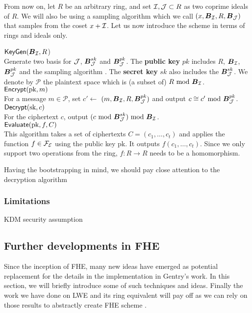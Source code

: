 From now on, let $R$ be an arbitrary ring, and set $\mathcal{I}, \mathcal{J} \subset R$ as two coprime ideals of $R$.  We will also be using a sampling algorithm which we call $(x, \boldsymbol{B}_{\mathcal{I}} , R, \boldsymbol{B}_{\mathcal{J}})$ that samples from the coset $x + \mathcal{I}$. Let us now introduce the scheme in terms of rings and ideals only.

\begin{mdframed}
	$\textsf{KeyGen}(\boldsymbol{B}_{\mathcal{I}}, R$) \\
	Generate two basis for $\mathcal{J}$, $\boldsymbol{B}_{\mathcal{J}}^{sk}$ and $\boldsymbol{B}_{\mathcal{J}}^{pk}$. The \textbf{public key} $pk$ includes $R$, $\boldsymbol{B}_{\mathcal{I}}$, $\boldsymbol{B}_{\mathcal{J}}^{pk}$ and the sampling algorithm . The \textbf{secret key} $sk$  also includes the $\boldsymbol{B}_{\mathcal{J}}^{sk}$. We denote by $\mathcal{P}$ the plaintext space which is (a subset of) $R \text{ mod } \boldsymbol{B}_{\mathcal{I}}$.\\
	$\textsf{Encrypt}(\text{pk}, m)$ \\
	For a message $m \in \mathcal{P}$, set $c' \leftarrow$ $(m, \boldsymbol{B}_{\mathcal{I}}, R, \boldsymbol{B}_{\mathcal{J}}^{pk})$ and output $c \cong c' \text{ mod } \boldsymbol{B}_{\mathcal{J}}^{pk}$.\\
	$\textsf{Decrypt}(\text{sk}, c)$ \\
	For the ciphertext $c$, output $(c \text{ mod } \boldsymbol{B}_{\mathcal{J}}^{sk}) \text{ mod } \boldsymbol{B}_{\mathcal{I}}$.\\
	$\textsf{Evaluate}(\text{pk}, f, C)$ \\
	This algorithm takes a set of ciphertexts $C = (c_1, \ldots, c_t)$ and applies the function $f \in \mathcal{F}_{\mathcal{E}}$ using the public key pk. It outputs $f(c_1, \ldots, c_t)$. Since we only support two operations from the ring, $f: R \rightarrow R$ needs to be a homomorphism.
\end{mdframed}

Having the bootstrapping in mind, we should pay close attention to the decryption algorithm
\subsubsection{Limitations}
KDM security assumption

\subsection{Further developments in FHE}
Since the inception of FHE, many new ideas have emerged as potential replacement for the details in the implementation in Gentry's work. In this section, we will briefly introduce some of such techniques and ideas. Finally the work we have done on LWE and its ring equivalent will pay off as we can rely on those results to abstractly create FHE scheme . 

